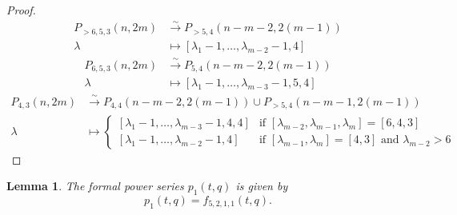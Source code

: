 \documentclass[12pt, a4paper]{article}
\newtheorem{lemma}[theorem]{Lemma}
\theoremstyle{remark}
\begin{document}
\begin{proof}
\begin{align*}
    P_{>6, 5, 3}(n, 2m) &\xrightarrow{\sim} P_{>5, 4}(n - m - 2, 2(m - 1)) \\
    \lambda &\mapsto [\lambda_1 - 1, \dots, \lambda_{m - 2} - 1, 4]
  \end{align*}
  \begin{align*}
    P_{6, 5, 3}(n, 2m) &\xrightarrow{\sim} P_{5, 4}(n - m - 2, 2(m - 1)) \\
    \lambda &\mapsto [\lambda_1 - 1, \dots, \lambda_{m - 3} - 1, 5, 4]
  \end{align*}
  \begin{align*}
    P_{4, 3}(n, 2m) &\xrightarrow{\sim} P_{4, 4}(n - m - 2, 2(m - 1)) \cup P_{>5, 4}(n - m - 1, 2(m - 1)) \\
    \lambda &\mapsto
              \begin{cases}
                [\lambda_1 - 1, \dots, \lambda_{m - 3} - 1, 4, 4] &\text{if }[\lambda_{m - 2}, \lambda_{m - 1}, \lambda_m] = [6, 4, 3] \\
                [\lambda_1 - 1, \dots, \lambda_{m - 2} - 1, 4] &\text{if }[\lambda_{m - 1}, \lambda_m] = [4, 3]\text{ and }\lambda_{m - 2} > 6
              \end{cases}
  \end{align*}
\end{proof}

\begin{lemma}
  \label{lmm:3}
  The formal power series $p_1(t, q)$ is given by
  \begin{equation*}
    p_1(t, q)=f_{5, 2, 1, 1}(t, q).
  \end{equation*}
\end{lemma}
\end{document}
